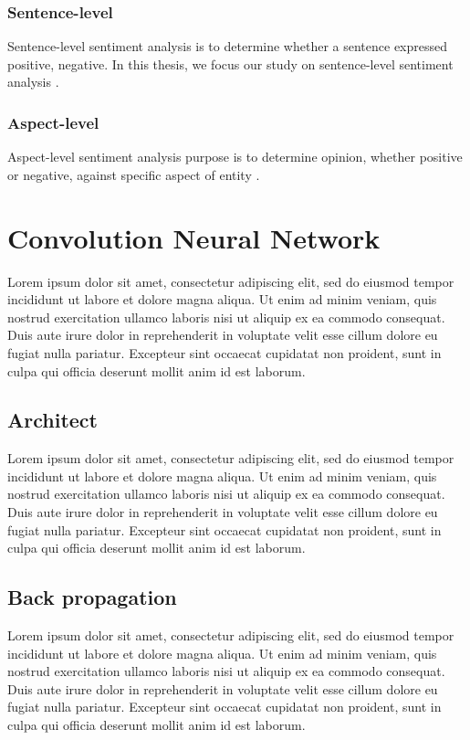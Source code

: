 \subsubsection{Sentence-level}
Sentence-level sentiment analysis is to determine whether a sentence expressed positive, negative. In this thesis, we focus our study on sentence-level sentiment analysis \cite{liu2012sentiment}.
\subsubsection{Aspect-level}
Aspect-level  sentiment analysis purpose is to determine opinion, whether positive or negative, against specific aspect of entity \cite{liu2012sentiment}.



\section{Convolution Neural Network}
Lorem ipsum dolor sit amet, consectetur adipiscing elit, sed do eiusmod tempor incididunt ut labore et dolore magna aliqua. Ut enim ad minim veniam, quis nostrud exercitation ullamco laboris nisi ut aliquip ex ea commodo consequat. Duis aute irure dolor in reprehenderit in voluptate velit esse cillum dolore eu fugiat nulla pariatur. Excepteur sint occaecat cupidatat non proident, sunt in culpa qui officia deserunt mollit anim id est laborum.
\subsection{Architect}
Lorem ipsum dolor sit amet, consectetur adipiscing elit, sed do eiusmod tempor incididunt ut labore et dolore magna aliqua. Ut enim ad minim veniam, quis nostrud exercitation ullamco laboris nisi ut aliquip ex ea commodo consequat. Duis aute irure dolor in reprehenderit in voluptate velit esse cillum dolore eu fugiat nulla pariatur. Excepteur sint occaecat cupidatat non proident, sunt in culpa qui officia deserunt mollit anim id est laborum.
\subsection{Back propagation}
Lorem ipsum dolor sit amet, consectetur adipiscing elit, sed do eiusmod tempor incididunt ut labore et dolore magna aliqua. Ut enim ad minim veniam, quis nostrud exercitation ullamco laboris nisi ut aliquip ex ea commodo consequat. Duis aute irure dolor in reprehenderit in voluptate velit esse cillum dolore eu fugiat nulla pariatur. Excepteur sint occaecat cupidatat non proident, sunt in culpa qui officia deserunt mollit anim id est laborum.
